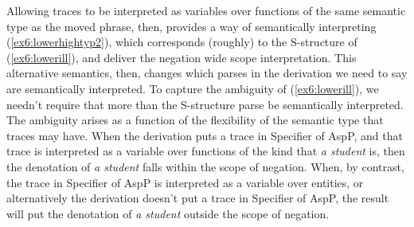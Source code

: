 Allowing traces to be interpreted as variables over functions of the same semantic type as the moved phrase, then, provides a way of semantically interpreting (\ref{ex6:lowerhightyp2}), which corresponds (roughly) to the S-structure of (\ref{ex6:lowerill}), and deliver the negation wide scope interpretation. This alternative semantics, then, changes which parses in the derivation we need to say are semantically interpreted. To capture the ambiguity of (\ref{ex6:lowerill}), we needn't require that more than the S-structure parse be semantically interpreted. The ambiguity arises as a function of the flexibility of the semantic type that traces may have. When the derivation puts a trace in Specifier of AspP, and that trace is interpreted as a variable over functions of the kind that \emph{a student} is, then the denotation of \emph{a student} falls within the scope of negation. When, by contrast, the trace in Specifier of AspP is interpreted as a variable over entities, or alternatively the derivation doesn't put a trace in Specifier of AspP, the result will put the denotation of \emph{a student} outside the scope of negation.
%
%
%
%


